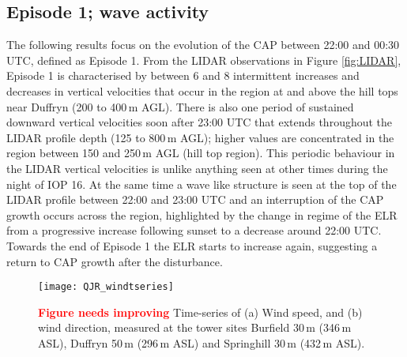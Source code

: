 \documentclass[times]{qjrms4}
\begin{document}
\subsection{Episode 1; wave activity}
\label{ep1}
The following results focus on the evolution of the CAP between 22:00 and 00:30 UTC, defined as Episode 1. From the LIDAR observations in Figure \ref{fig:LIDAR}, Episode 1 is characterised by between 6 and 8 intermittent increases and decreases in vertical velocities that occur in the region at and above the hill tops near Duffryn (200 to 400$\,\mbox{m}$ AGL). There is also one period of sustained downward vertical velocities soon after 23:00 UTC that extends throughout the LIDAR profile depth (125 to 800$\,\mbox{m}$ AGL); higher values are concentrated in the region between 150 and 250$\,\mbox{m}$ AGL (hill top region). This periodic behaviour in the LIDAR vertical velocities is unlike anything seen at other times during the night of IOP 16. At the same time a wave like structure is seen at the top of the LIDAR profile between 22:00 and 23:00 UTC and an interruption of the CAP growth occurs across the region, highlighted by the change in regime of the ELR from a progressive increase following sunset to a decrease around 22:00 UTC. Towards the end of Episode 1 the ELR starts to increase again, suggesting a return to CAP growth after the disturbance.
%
       \begin{figure*}
        \centering
        \texttt{[image: QJR\_windtseries]}
        \caption{\textcolor{red}{\bf Figure needs improving} Time-series of (a) Wind speed, and (b) wind direction, measured at the tower sites Burfield 30$\,\mbox{m}$ (346$\,\mbox{m}$ ASL), Duffryn 50$\,\mbox{m}$ (296$\,\mbox{m}$ ASL) and Springhill 30$\,\mbox{m}$ (432$\,\mbox{m}$ ASL).}
        \label{fig:windtseries}
        \end{figure*}
        
\end{document}
